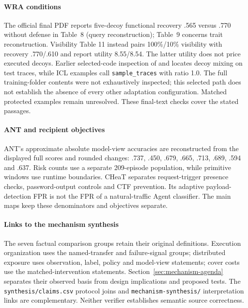 \paragraph{WRA conditions} The official final PDF reports five-decoy functional recovery .565 versus .770 without defense in Table~8 (query reconstruction); Table~9 concerns trait reconstruction. Visibility Table 11 instead pairs 100\%/10\% visibility with recovery .770/.610 and report utility 8.55/8.54. The latter utility does not price executed decoys. Earlier selected-code inspection of  and  locates decoy mixing on test traces, while ICL examples call \texttt{sample\_traces} with ratio 1.0. The full training-folder contents were not exhaustively inspected; this selected path does not establish the absence of every other adaptation configuration. Matched protected examples remain unresolved. These final-text checks cover the stated passages.

\paragraph{ANT and recipient objectives} ANT's approximate absolute model-view accuracies are reconstructed from the displayed full scores and rounded changes: .737, .450, .679, .665, .713, .689, .594 and .637. Risk counts use a separate 209-episode population, while primitive windows use runtime boundaries. CHeaT separates request-trigger presence checks, password-output controls and CTF prevention. Its adaptive payload-detection FPR is not the FPR of a natural-traffic Agent classifier. The main maps keep these denominators and objectives separate.

\paragraph{Links to the mechanism synthesis} The seven factual comparison groups retain their original definitions. Execution organization uses the named-transfer and failure-signal groups; distributed exposure uses observation, label, policy and model-view statements; cover costs use the matched-intervention statements. Section~\ref{sec:mechanism-agenda} separates their observed basis from design implications and proposed tests. The \texttt{synthesis/claims.csv} protocol joins and \texttt{mechanism-synthesis/} interpretation links are complementary. Neither verifier establishes semantic source correctness.

